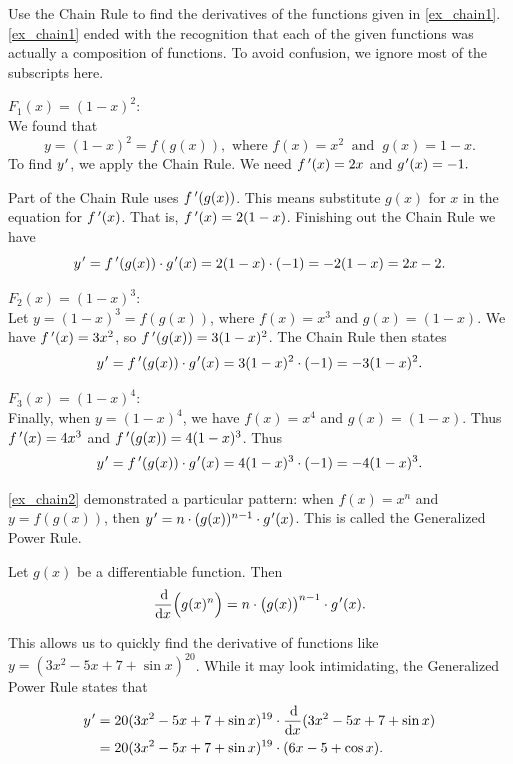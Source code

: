 \begin{example}\label{ex_chain2}%
Use the Chain Rule to find the derivatives of the functions given in \autoref{ex_chain1}.
\solution
\autoref{ex_chain1} ended with the recognition that each of the given functions was actually a composition of functions. To avoid confusion, we ignore most of the subscripts here.

\noindent $F_1(x) = (1-x)^2:$\\
\indent We found that
\[y=(1-x)^2 = f(g(x)), \text{ where } f(x) = x^2\ \text{ and }\ g(x) = 1-x.\]
To find $y\primeskip'$, we apply the Chain Rule. We need $f\,'(x)=2x$ and $g\primeskip'(x)=-1.$

Part of the Chain Rule uses $f\,'(g(x))$. This means substitute $g(x)$ for $x$ in the equation for $f\,'(x)$. That is, $f\,'(x) = 2(1-x)$.  Finishing out the Chain Rule we have
\[y\primeskip' = \fp(g(x))\cdot g\primeskip'(x) = 2(1-x)\cdot (-1) = -2(1-x)= 2x-2.\]

\noindent $F_2(x) = (1-x)^3$:\\
\indent Let $y = (1-x)^3 = f(g(x))$, where $f(x) = x^3$ and $g(x) = (1-x)$. We have $f\,'(x) = 3x^2$, so $f\,'(g(x)) = 3(1-x)^2$. The Chain Rule then states
\[y\primeskip' = \fp(g(x))\cdot g\primeskip'(x) = 3(1-x)^2\cdot(-1) = -3(1-x)^2.\]

\noindent $F_3(x) = (1-x)^4$:\\
\indent Finally, when $y = (1-x)^4$, we have $f(x)= x^4$ and $g(x) = (1-x)$. Thus $f\,'(x) = 4x^3$ and $f\,'(g(x)) = 4(1-x)^3$. Thus
\[y\primeskip' = \fp(g(x))\cdot g\primeskip'(x) = 4(1-x)^3\cdot (-1) = -4(1-x)^3.\]
\end{example}

\autoref{ex_chain2} demonstrated a particular pattern: when $f(x)=x^n$ and $y=f(g(x))$, then $y\primeskip' =n\cdot (g(x))^{n-1}\cdot g\primeskip'(x)$. This  is called the Generalized Power Rule.

\begin{theorem}\label{thm:gen_power_rule}%
Let $g(x)$ be a differentiable function. Then
\[\frac{\dd}{\dd x}\Bigl(g(x)^n\Bigr) = n\cdot \bigl(g(x)\bigr)^{n-1}\cdot g\primeskip'(x).\]
\end{theorem}

This allows us to quickly find the derivative of functions like $y = (3x^2-5x+7+\sin x)^{20}$. While it may look intimidating, the Generalized Power Rule states that
\begin{align*}
y\primeskip'
&= 20(3x^2 -5x +7 + \sin x)^{19} \cdot  \frac{\dd}{\dd x} (3x^2 -5x +7 + \sin x)\\
&= 20(3x^2-5x+7+\sin x)^{19}\cdot (6x-5+\cos x).
\end{align*}

